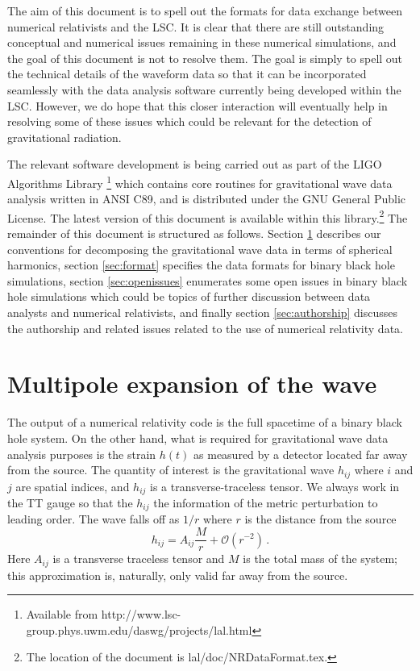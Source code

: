 \documentclass[10pt]{ligodcc}
\renewcommand{\texttt}[1]{{\ttfamily\color{blue}#1}}
\begin{document}
The aim of this document is to spell out the formats for data exchange
between numerical relativists and the LSC.  It is clear that there are
still outstanding conceptual and numerical issues remaining in these
numerical simulations, and the goal of this document is not to resolve
them.  The goal is simply to spell out the technical details of the
waveform data so that it can be incorporated seamlessly with the data
analysis software currently being developed within the LSC.  However,
we do hope that this closer interaction will eventually help in
resolving some of these issues which could be relevant for the
detection of gravitational radiation.

The relevant software development is being carried out as part of the
LIGO Algorithms Library
\footnote{Available from \texttt{http://www.lsc-group.phys.uwm.edu/daswg/projects/lal.html}}
which contains core routines for gravitational wave data analysis
written in ANSI C89, and is distributed under the GNU General Public
License.  The latest version of this document is available within
this library.\footnote{The location of the document is
  \texttt{lal/doc/NRDataFormat.tex}.}  The remainder of this document
is structured as follows.  Section \ref{sec:multipoles} describes our
conventions for decomposing the gravitational wave data in terms of
spherical harmonics, section \ref{sec:format} specifies the data
formats for binary black hole simulations, section
\ref{sec:openissues} enumerates some open issues in binary black hole
simulations which could be topics of further discussion between data
analysts and numerical relativists, and finally section
\ref{sec:authorship} discusses the authorship and related issues
related to the use of numerical relativity data.  



\section{Multipole expansion of the wave}
\label{sec:multipoles}

The output of a numerical relativity code is the full spacetime of a
binary black hole system. On the other hand, what is required for
gravitational wave data analysis purposes is the strain $h(t)$ as
measured by a detector located far away from the source.  The quantity
of interest is the gravitational wave $h_{ij}$ where $i$ and $j$ are
spatial indices, and $h_{ij}$ is a transverse-traceless tensor.  We
always work in the TT gauge so that the $h_{ij}$ the information of
the metric perturbation to leading order.  The wave falls off as $1/r$
where $r$ is the distance from the source
\begin{equation}
  \label{eq:1}
  h_{ij} = A_{ij}\frac{M}{r} + \mathcal{O}\left(r^{-2}\right)\,.
\end{equation}
Here $A_{ij}$ is a transverse traceless tensor and $M$ is the total
mass of the system; this approximation is, naturally, only valid far
away from the source.
\end{document}
